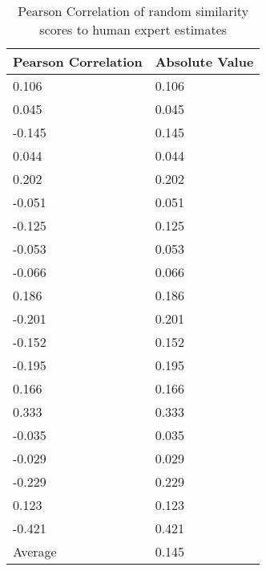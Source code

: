 \documentclass{article}
\begin{document}
\begin{table}[h!]
\caption{Pearson Correlation of random similarity scores to human expert estimates}
\centering
\begin{tabular}{ll}
	\toprule
	Pearson Correlation & Absolute Value \\
	\midrule
	0.106 & 0.106 \\
	0.045 & 0.045 \\
	-0.145 & 0.145 \\
	0.044 & 0.044 \\
	0.202 & 0.202 \\
	-0.051 & 0.051 \\
	-0.125 & 0.125 \\
	-0.053 & 0.053 \\
	-0.066 & 0.066 \\
	0.186 & 0.186 \\
	-0.201 & 0.201 \\
	-0.152 & 0.152 \\
	-0.195 & 0.195 \\
	0.166 & 0.166 \\
	0.333 & 0.333 \\
	-0.035 & 0.035 \\
	-0.029 & 0.029 \\
	-0.229 & 0.229 \\
	0.123 & 0.123 \\
	-0.421 & 0.421 \\
		\midrule
	Average & 0.145\\
	\bottomrule
\end{tabular}
\label{table:randomresults}
\end{table}
\end{document}
